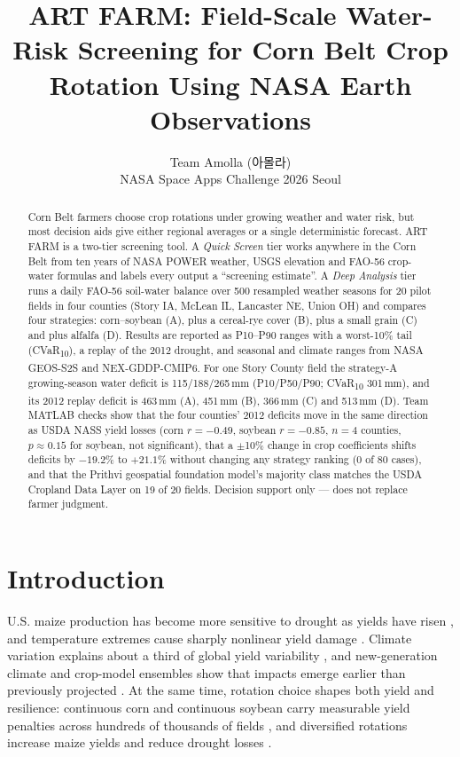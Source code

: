 \documentclass[10pt,twocolumn]{article}
\title{\textbf{ART FARM: Field-Scale Water-Risk Screening for Corn Belt Crop Rotation Using NASA Earth Observations}}
\author{Team Amolla ({\kofont 아몰라})\\NASA Space Apps Challenge 2026 Seoul}
\date{}
\begin{document}
\maketitle
\renewcommand{\thefootnote}{}
\renewcommand{\thefootnote}{\arabic{footnote}}

\begin{abstract}
Corn Belt farmers choose crop rotations under growing weather and water risk, but most decision aids give either regional averages or a single deterministic forecast. ART FARM is a two-tier screening tool. A \emph{Quick Screen} tier works anywhere in the Corn Belt from ten years of NASA POWER weather, USGS elevation and FAO-56 crop-water formulas and labels every output a ``screening estimate''. A \emph{Deep Analysis} tier runs a daily FAO-56 soil-water balance over 500 resampled weather seasons for 20 pilot fields in four counties (Story IA, McLean IL, Lancaster NE, Union OH) and compares four strategies: corn--soybean (A), plus a cereal-rye cover (B), plus a small grain (C) and plus alfalfa (D). Results are reported as P10--P90 ranges with a worst-10\% tail (CVaR\textsubscript{10}), a replay of the 2012 drought, and seasonal and climate ranges from NASA GEOS-S2S and NEX-GDDP-CMIP6. For one Story County field the strategy-A growing-season water deficit is 115/188/265\,mm (P10/P50/P90; CVaR\textsubscript{10} 301\,mm), and its 2012 replay deficit is 463\,mm (A), 451\,mm (B), 366\,mm (C) and 513\,mm (D). Team MATLAB checks show that the four counties' 2012 deficits move in the same direction as USDA NASS yield losses (corn $r=-0.49$, soybean $r=-0.85$, $n=4$ counties, $p\approx0.15$ for soybean, not significant), that a $\pm$10\% change in crop coefficients shifts deficits by $-19.2$\% to $+21.1$\% without changing any strategy ranking (0 of 80 cases), and that the Prithvi geospatial foundation model's majority class matches the USDA Cropland Data Layer on 19 of 20 fields. Decision support only --- does not replace farmer judgment.
\end{abstract}

\section{Introduction}
U.S. maize production has become more sensitive to drought as yields have risen \citep{lobell2014}, and temperature extremes cause sharply nonlinear yield damage \citep{schlenker2009}. Climate variation explains about a third of global yield variability \citep{ray2015}, and new-generation climate and crop-model ensembles show that impacts emerge earlier than previously projected \citep{jagermeyr2021,rosenzweig2014,hatfield2011}. At the same time, rotation choice shapes both yield and resilience: continuous corn and continuous soybean carry measurable yield penalties across hundreds of thousands of fields \citep{seifert2017}, and diversified rotations increase maize yields and reduce drought losses \citep{bowles2020}.
\end{document}
